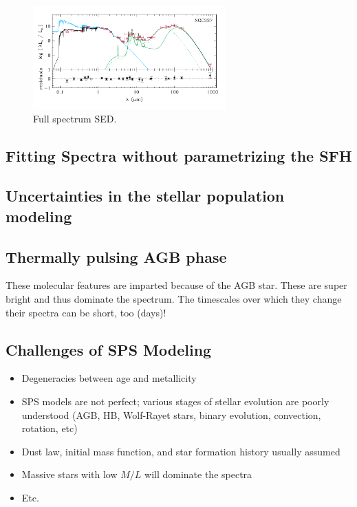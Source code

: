 \documentclass{article}
\begin{document}
\begin{figure}
    \centering
    \includegraphics[width=0.66\textwidth]{figs/Screen Shot 2021-09-24 at 9.34.40 AM.png}
    \caption{Full spectrum SED.}
    \label{fig:fullsed}
\end{figure}

\subsection{Fitting Spectra without parametrizing the SFH}

\subsection{Uncertainties in the stellar population modeling}

\subsection{Thermally pulsing AGB phase}

These molecular features are imparted because of the AGB star. These are super bright and thus dominate the spectrum. The timescales over which they change their spectra can be short, too (days)! 

\subsection{Challenges of SPS Modeling}

\begin{itemize}
    \item Degeneracies between age and metallicity
    \item SPS models are not perfect; various stages of stellar evolution are poorly understood (AGB, HB, Wolf-Rayet stars, binary evolution, convection, rotation, etc)
    \item Dust law, initial mass function, and star formation history usually assumed
    \item Massive stars with low $M/L$ will dominate the spectra
    \item Etc. 
\end{itemize}
\end{document}
